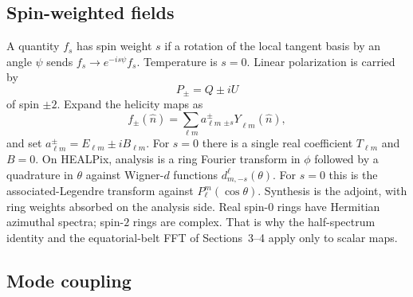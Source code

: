 \documentclass[usenatbib,useAMS]{mnras}
\begin{document}
\subsection{Spin-weighted fields}

A quantity $f_s$ has spin weight $s$ if a rotation of the local tangent basis by an angle $\psi$ sends $f_s\to e^{-is\psi}f_s$. Temperature is $s=0$. Linear polarization is carried by
\begin{equation}
  P_\pm=Q\pm iU
\end{equation}
of spin $\pm2$. Expand the helicity maps as
\begin{equation}
  f_\pm(\hat n)=\sum_{\ell m}a^\pm_{\ell m}\,{_{\pm s}Y}_{\ell m}(\hat n),
\end{equation}
and set $a^\pm_{\ell m}=E_{\ell m}\pm iB_{\ell m}$. For $s=0$ there is a single real coefficient $T_{\ell m}$ and $B=0$. On HEALPix, analysis is a ring Fourier transform in $\phi$ followed by a quadrature in $\theta$ against Wigner-$d$ functions $d^\ell_{m,-s}(\theta)$. For $s=0$ this is the associated-Legendre transform against $P_\ell^m(\cos\theta)$. Synthesis is the adjoint, with ring weights absorbed on the analysis side. Real spin-$0$ rings have Hermitian azimuthal spectra; spin-$2$ rings are complex. That is why the half-spectrum identity and the equatorial-belt FFT of Sections~3--4 apply only to scalar maps.

\subsection{Mode coupling}
\end{document}
